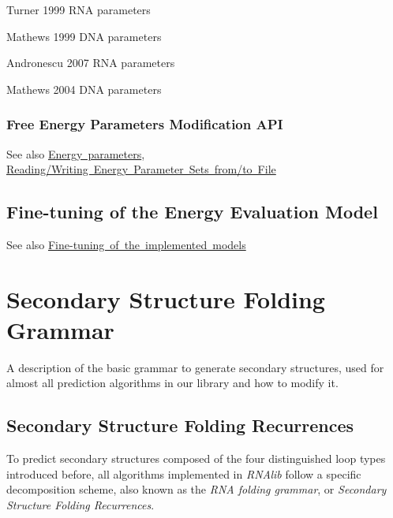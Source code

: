 \begin{DoxyItemize}
\item Turner 1999 R\+NA parameters
\item Mathews 1999 D\+NA parameters
\item Andronescu 2007 R\+NA parameters
\item Mathews 2004 D\+NA parameters
\end{DoxyItemize}\hypertarget{energy_evaluation_sec_energy_parameters_api}{}\subsubsection{Free Energy Parameters Modification A\+PI}\label{energy_evaluation_sec_energy_parameters_api}
\begin{DoxySeeAlso}{See also}
\mbox{\hyperlink{group__energy__parameters}{Energy parameters}}, \mbox{\hyperlink{group__energy__parameters__rw}{Reading/\+Writing Energy Parameter Sets from/to File}}
\end{DoxySeeAlso}
\hypertarget{energy_evaluation_sec_model_details}{}\subsection{Fine-\/tuning of the Energy Evaluation Model}\label{energy_evaluation_sec_model_details}
\begin{DoxySeeAlso}{See also}
\mbox{\hyperlink{group__model__details}{Fine-\/tuning of the implemented models}}
\end{DoxySeeAlso}
 \hypertarget{folding_grammar}{}\section{Secondary Structure Folding Grammar}\label{folding_grammar}
A description of the basic grammar to generate secondary structures, used for almost all prediction algorithms in our library and how to modify it.\hypertarget{folding_grammar_sec_recursions}{}\subsection{Secondary Structure Folding Recurrences}\label{folding_grammar_sec_recursions}
To predict secondary structures composed of the four distinguished loop types introduced before, all algorithms implemented in {\itshape R\+N\+Alib} follow a specific decomposition scheme, also known as the {\itshape R\+NA folding grammar}, or {\itshape Secondary Structure Folding Recurrences}.

